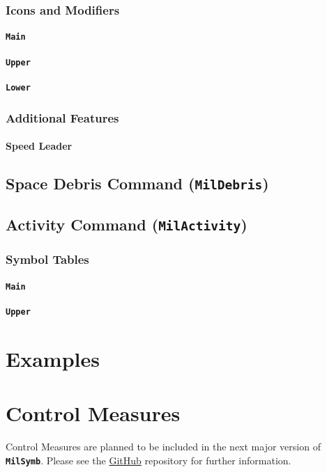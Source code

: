 \documentclass[a4paper, titlepage]{article}
\begin{document}
\subsubsection{Icons and Modifiers}

\paragraph{\texttt{Main}}
%

\paragraph{\texttt{Upper}}
%

\paragraph{\texttt{Lower}}
%

\subsubsection{Additional Features}

\paragraph{Speed Leader}

\subsection{Space Debris Command (\textbf{\texttt{MilDebris}})}

\subsection{Activity Command (\textbf{\texttt{MilActivity}})}

\subsubsection{Symbol Tables}

\paragraph{\texttt{Main}}
%

\paragraph{\texttt{Upper}}
%

\section{Examples}

\section{Control Measures}

Control Measures are planned to be included in the next major version of \textbf{\texttt{MilSymb}}. Please see the \href{https://github.com/ralphieraccoon/MilSymb}{GitHub} repository for further information.
\end{document}
